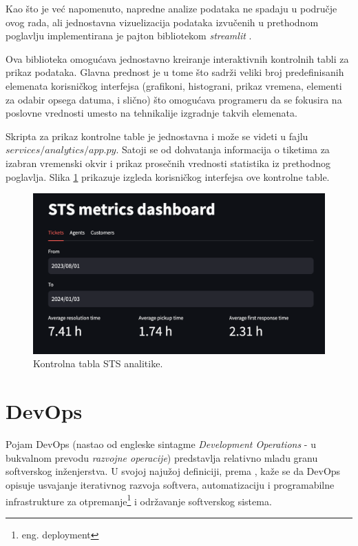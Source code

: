 \documentclass[12pt,oneside]{memoir}
\begin{document}
Kao što je već napomenuto, napredne analize podataka ne spadaju u područje ovog rada, ali jednostavna vizuelizacija podataka izvučenih u prethodnom poglavlju implementirana je pajton bibliotekom \textit{streamlit} \cite{streamlitdocs}.

Ova biblioteka omogućava jednostavno kreiranje interaktivnih kontrolnih tabli za prikaz podataka. Glavna prednost je u tome što sadrži veliki broj predefinisanih elemenata korisničkog interfejsa (grafikoni, histograni, prikaz vremena, elementi za odabir opsega datuma, i slično) što omogućava programeru da se fokusira na poslovne vrednosti umesto na tehnikalije izgradnje takvih elemenata. 

Skripta za prikaz kontrolne table je jednostavna i može se videti u fajlu $services/analytics/app.py$. Satoji se od dohvatanja informacija o tiketima za izabran vremenski okvir i prikaz prosečnih vrednosti statistika iz prethodnog poglavlja. Slika \ref{fig:stsmetrics} prikazuje izgleda korisničkog interfejsa ove kontrolne table.

\begin{figure}[h]
  \centering
  \includegraphics[width=1\textwidth]{docs/images/ch_5/stsmetrics.png} 
  \caption{Kontrolna tabla STS analitike.}
  \label{fig:stsmetrics}
\end{figure}


\chapter{DevOps}

Pojam DevOps (nastao od engleske sintagme \textit{Development Operations} - u bukvalnom prevodu \textit{razvojne operacije}) predstavlja relativno mladu granu softverskog inženjerstva. U svojoj najužoj definiciji, prema \cite{zdevopsarticle}, kaže se da DevOps opisuje usvajanje iterativnog razvoja softvera, automatizaciju i programabilne infrastrukture za otpremanje\footnote{eng. deployment} i održavanje softverskog sistema.
\end{document}
